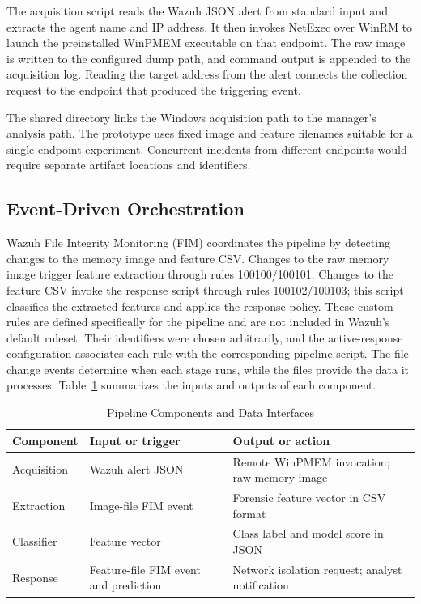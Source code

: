 \documentclass[conference]{IEEEtran}
\begin{document}
The acquisition script reads the Wazuh JSON alert from standard input and extracts the agent name and IP address. It then invokes NetExec over WinRM to launch the preinstalled WinPMEM executable on that endpoint. The raw image is written to the configured dump path, and command output is appended to the acquisition log. Reading the target address from the alert connects the collection request to the endpoint that produced the triggering event.

The shared directory links the Windows acquisition path to the manager's analysis path. 
The prototype uses fixed image and feature filenames suitable for a single-endpoint experiment. Concurrent incidents from different endpoints would require separate artifact locations and identifiers.

\subsection{Event-Driven Orchestration}
Wazuh File Integrity Monitoring (FIM) coordinates the pipeline by detecting changes to the memory image and feature CSV. Changes to the raw memory image trigger feature extraction through rules 100100/100101. Changes to the feature CSV invoke the response script through rules 100102/100103; this script classifies the extracted features and applies the response policy. These custom rules are defined specifically for the pipeline and are not included in Wazuh's default ruleset. Their identifiers were chosen arbitrarily, and the active-response configuration associates each rule with the corresponding pipeline script. The file-change events determine when each stage runs, while the files provide the data it processes. Table~\ref{tab:interfaces} summarizes the inputs and
outputs of each component.

\begin{table}[t]
\caption{Pipeline Components and Data Interfaces}
\label{tab:interfaces}
\centering
\footnotesize
\begin{tabular}{@{}p{1.45cm}p{2.85cm}p{3.55cm}@{}}
\toprule
Component & Input or trigger & Output or action \\
\midrule
Acquisition & Wazuh alert JSON & Remote WinPMEM invocation; raw memory image \\
Extraction & Image-file FIM event & Forensic feature vector in CSV format \\
Classifier & Feature vector & Class label and model score in JSON \\
Response & Feature-file FIM event and prediction & Network isolation request; analyst notification \\
\bottomrule
\end{tabular}
\end{table}
\end{document}
